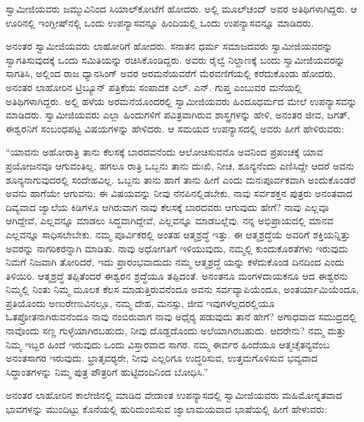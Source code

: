  ಸ್ವಾಮೀಜಿಯವರು ಜಮ್ಮುವಿನಿಂದ ಸಿಯಾಲ್‍ಕೋಟೆಗೆ ಹೋದರು. ಅಲ್ಲಿ ಮೂಲ್‍ಚಂದ್ ಅವರ ಅತಿಥಿಗಳಾಗಿದ್ದರು. ಆ ಊರಿನಲ್ಲಿ ಇಂಗ್ಲೀಷ್‍ನಲ್ಲಿ ಒಂದು ಉಪನ್ಯಾಸವನ್ನೂ ಹಿಂದಿಯಲ್ಲಿ ಒಂದು ಉಪನ್ಯಾಸವನ್ನೂ ಮಾಡಿದರು. 

 ಅನಂತರ ಸ್ವಾಮೀಜಿಯವರು ಲಾಹೋರಿಗೆ ಹೋದರು. ಸನಾತನ ಧರ್ಮ ಸಮಾಜದವರು ಸ್ವಾಮೀಜಿಯವರನ್ನು ಸ್ವಾಗತಿಸುವುದಕ್ಕೆ ಒಂದು ಸಮಿತಿಯನ್ನು ರಚಿಸಿಕೊಂಡಿದ್ದರು. ಅವರು ರೈಲ್ವೆ ನಿಲ್ದಾಣಕ್ಕೆ ಬಂದು ಸ್ವಾಮೀಜಿಯವರನ್ನು ಸಾಗತಿಸಿ, ಅಲ್ಲಿಂದ ರಾಜ ಧ್ಯಾನಸಿಂಗ್ ಅವರ ಅರಮನೆಯವರೆಗೆ ಮೆರವಣಿಗೆಯಲ್ಲಿ ಕರೆದುಕೊಂಡು ಹೋದರು. ಅನಂತರ ಲಾಹೋರಿನ ಟ್ರಿಬ್ಯೂನ್ ಪತ್ರಿಕೆಯ ಸಂಪಾದಕ ಎಲ್. ಎನ್. ಗುಪ್ತ ಎಂಬುವರ ಮನೆಯಲ್ಲಿ ಅತಿಥಿಗಳಾಗಿದ್ದರು. ಅಲ್ಲಿ ಹಳೆಯ ಅರಮನೆಯೊಂದರಲ್ಲಿ ಸ್ವಾಮೀಜಿಯವರು ಹಿಂದೂಧರ್ಮದ ಮೇಲೆ ಉಪನ್ಯಾಸವನ್ನು ಮಾಡಿದರು. ಸ್ವಾಮೀಜಿಯವರು ಎಲ್ಲಾ ಹಿಂದುಗಳಿಗೆ ಪವಿತ್ರವಾಗಿರುವ ಶಾಸ್ತ್ರಗಳನ್ನು ಹೇಳಿ, ಅನಂತರ ಜೀವ, ಜಗತ್, ಈಶ್ವರನಿಗೆ ಸಂಬಂಧಪಟ್ಟ ವಿಷಯಗಳನ್ನು ಹೇಳಿದರು. ಆ ಸಮಯದ ಉಪನ್ಯಾಸದಲ್ಲಿ ಅವರು ಹೀಗೆ ಹೇಳಿರುವರು: 

 “ಯಾವನು ಅಹೋರಾತ್ರಿ ತಾನು ಕೆಲಸಕ್ಕೆ ಬಾರದವನೆಂದು ಆಲೋಚಿಸುವನೊ ಅವನಿಂದ ಪ್ರಪಂಚಕ್ಕೆ ಯಾವ ಪ್ರಯೋಜನವೂ ಆಗುವಂತಿಲ್ಲ. ಹಗಲೂ ರಾತ್ರಿ ಒಬ್ಬನು ತಾನು ದುಃಖಿ, ನೀಚ, ಶೂನ್ಯನೆಂದು ಎಣಿಸಿದ್ದೇ ಆದರೆ ಅವನು ಶೂನ್ಯನಾಗುವುದರಲ್ಲಿ ಸಂದೇಹವಿಲ್ಲ. ಒಬ್ಬನು ತಾನು ಹಾಗೆ ತಾನು ಹೀಗೆ ಎಂದು ಮನಃಪೂರ್ವಕವಾಗಿ ಅಂದುಕೊಂಡರೆ ಅವನು ಹಾಗೆಯೇ ಆಗುವನು: ಈ ವಿಷಯವನ್ನು ನೀವು ನೆನಪಿನಲ್ಲಿಡಬೇಕು. ನಾವು ಸರ್ವಶಕ್ತನ ಪುತ್ರರು ಅನಂತವಾದ ದಿವ್ಯವಾದ ಜ್ವಾಲೆಯ ಕಿಡಿಗಳೂ ಆಗಿರುವಾಗ ನಾವು ಕೆಲಸಕ್ಕೆ ಬಾರದವರು ಆಗುವುದು ಹೇಗೆ? ನಾವು ಎಲ್ಲವೂ ಆಗಿದ್ದೇವೆ, ಎಲ್ಲವನ್ನೂ ಮಾಡಲು ಸಿದ್ಧವಾಗಿದ್ದೇವೆ, ಎಲ್ಲವನ್ನೂ ಮಾಡಬಲ್ಲೆವು. ನನ್ನ ಅಭಿಪ್ರಾಯದಲ್ಲಿ ಮಾನವ ಎಲ್ಲವನ್ನೂ ಸಾಧಿಸಲೇಬೇಕು. ನಮ್ಮ ಪೂರ್ವಿಕರಲ್ಲಿ ಅಂತಹ ಆತ್ಮಶ್ರದ್ಧೆ ಇತ್ತು. ಈ ಆತ್ಮಶ್ರದ್ಧೆಯೆ ಅವರಿಗೆ ಶಕ್ತಿಯನ್ನಿತ್ತು ಅವರನ್ನು ನಾಗರಿಕರನ್ನಾಗಿ ಮಾಡಿತು. ನಾವು ಅಧೋಗತಿಗೆ ಇಳಿಯುವುದು, ನಮ್ಮಲ್ಲಿ ಕುಂದುಕೊರತೆಗಳು ಇರುವುದು ನಿಮಗೆ ನಿಜವಾಗಿ ತೋರಿದರೆ, ಇದು ಪ್ರಾರಂಭವಾದುದು ನಮ್ಮ ಆತ್ಮಶ್ರದ್ಧೆ ಯನ್ನು ಕಳೆದುಕೊಂಡ ದಿನದಿಂದ ಎಂದು ತಿಳಿಯಿರಿ. ಆತ್ಮಶ್ರದ್ಧೆ ತಪ್ಪಿತೆಂದರೆ ಈಶ್ವರನ ಶ್ರದ್ಧೆಯೂ ತಪ್ಪಿದಂತೆ. ಅನಂತನೂ ಮಂಗಳದಾಯಕನೂ ಆದ ಈಶ್ವರನು ನಿಮ್ಮಲ್ಲಿ ನಿಂತು ನಿಮ್ಮ ಮೂಲಕ ಕೆಲಸ ಮಾಡುತ್ತಿರುವನೆಂದೂ ಅವನು ಸರ್ವವ್ಯಾಪಿಯೆಂದೂ, ಅಂತರ್ಯಾಮಿಯೆಂದೂ, ಪ್ರತಿಯೊಂದು ಅಣುರೇಣುವಿನಲ್ಲೂ, ನಮ್ಮ ದೇಹ, ಮನಸ್ಸು, ಜೀವ ಇವುಗಳೆಲ್ಲದರಲ್ಲಿಯೂ ಓತಪ್ರೋತನಾಗಿರುವನೆಂದೂ ನಾವು ನಂಬಿರುವಾಗ ನಾವು ಅಧೈರ‍್ಯ ಪಡುವುದು ತಾನೆ ಹೇಗೆ? ಅಗಾಧವಾದ ಸಮುದ್ರದಲ್ಲಿ ನಾವೊಂದು ಸಣ್ಣ ಗುಳ್ಳೆಯಾಗಿರಬಹುದು, ನೀವು ದೊಡ್ಡದೊಂದು ಅಲೆಯಾಗಿರಬಹುದು. ಆದರೇನು? ನಮ್ಮ ಮತ್ತು ನಿಮ್ಮ ಇಬ್ಬರ ಹಿಂದೆ ಇರುವುದು ಒಂದು ವಿಸ್ತಾರವಾದ ಸಾಗರ. ನಮ್ಮ ಈರ್ವರ ಹಿಂದೆಯೂ ಆತ್ಮಚೈತನ್ಯವೆಂಬ ಅನಂತಸಾಗರ ಇರುವುದು. ಭ್ರಾತೃವರ‍್ಯರೇ, ನೀವು ಎಲ್ಲರಿಗೂ ಉದ್ಧರಿಸುವ, ಉತ್ತಮಗೊಳಿಸುವ ಭವ್ಯವಾದ ಸಿದ್ಧಾಂತಗಳನ್ನು ನಿಮ್ಮ ಪುತ್ರ ಪೌತ್ರರಿಗೆ ಹುಟ್ಟಿದಂದಿನಿಂದ ಬೋಧಿಸಿ.” 

 ಅನಂತರ ಲಾಹೋರಿನ ಕಾಲೇಜಿನಲ್ಲಿ ಮಾಡಿದ ವೇದಾಂತ ಉಪನ್ಯಾಸದಲ್ಲಿ ಸ್ವಾಮೀಜಿಯವರು ಮಹಿಮೋನ್ನತವಾದ ಭಾವಗಳನ್ನು ಮುಂದಿಟ್ಟು ಕೊನೆಯಲ್ಲಿ ಹುರಿದುಂಬಿಸುವ ಜ್ವಾಲಾಮಯವಾದ ಭಾಷೆಯಲ್ಲಿ ಹೀಗೆ ಹೇಳುವರು: 

